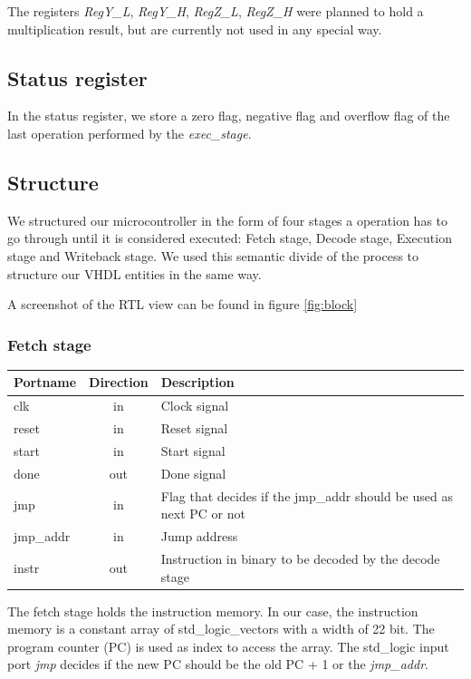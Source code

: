 The registers \textit{RegY\_L}, \textit{RegY\_H}, \textit{RegZ\_L}, \textit{RegZ\_H}
were planned to hold a multiplication result, but are currently not used in any special way.

\subsection{Status register} 

In the status register, we store a zero flag, negative flag and overflow flag of the last operation performed by the \textit{exec\_stage}. 

\subsection{Structure}

We structured our microcontroller in the form of four stages a operation has to go through until it is considered executed: Fetch stage, Decode stage, Execution stage and Writeback stage.
We used this semantic divide of the process to structure our VHDL entities in the same way.

A screenshot of the RTL view can be found in figure \ref{fig:block}

\subsubsection{Fetch stage}

\begin{center}
	\begin{tabular}{ | l | c | l | }
		\hline
		\textbf{Portname} & \textbf{Direction} & \textbf{Description} \\
		\hline
		clk & in & Clock signal \\
		reset & in  & Reset signal \\
		start & in  & Start signal \\
		done & out  & Done signal \\
		jmp & in  & Flag that decides if the jmp\_addr should be used as next PC or not \\
		jmp\_addr & in  & Jump address \\
		instr & out  & Instruction in binary to be decoded by the decode stage \\
		\hline
	\end{tabular} 
\end{center}


The fetch stage holds the instruction memory. In our case, the instruction memory is a constant array of std\_logic\_vectors with a width of 22 bit. The program counter (PC) is used as index to access the array. The std\_logic input port \textit{jmp} decides if the new PC should be the old PC + 1 or the \textit{jmp\_addr}. 

